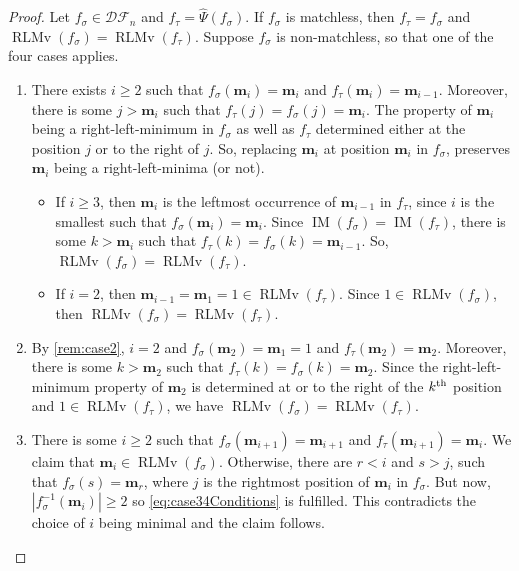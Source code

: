 \documentclass[reqno]{amsart}
\theoremstyle{definition}
\newcommand{\thsup}{\textnormal{th}}
\newcommand{\DSEF}{\mathcal{DF}}%
\newcommand{\fretherD}{\hat{\Psi}}
\newcommand{\caseOne}{\ensuremath{\heartsuit}}
\newcommand{\caseTwo}{\ensuremath{\spadesuit}}
\newcommand{\caseThree}{\ensuremath{\diamondsuit}}
\newcommand{\img}{\mathbf{m}}
\DeclareMathOperator{\RLMv}{RLMv}
\DeclareMathOperator{\supp}{IM}
\begin{document}
\begin{proof}
Let $f_\sigma\in \DSEF_n$ and $f_\tau=\fretherD(f_\sigma)$. 
If $f_\sigma$ is matchless, then $f_\tau=f_\sigma$ and  $\RLMv(f_\sigma)=\RLMv(f_\tau)$.
Suppose $f_\sigma$ is non-matchless, so that one of the four cases applies.

\begin{enumerate}[leftmargin=2cm]
 
	\item[\textbf{Case \caseOne:}] 
	There exists $i\geq 2$ such that $f_\sigma(\img_i)=\img_i$ and 
	$f_\tau(\img_i)=\img_{i-1}$. 
	Moreover, there is some $j>\img_i$ such that $f_\tau(j)=f_\sigma(j)=\img_i$. 
	The property of $\img_i$ being a right-left-minimum in $f_\sigma$
	as well as $f_\tau$ determined either at the position $j$
	or to the right of $j$. So, replacing $\img_i$ at position
	$\img_i$ in $f_\sigma$, preserves $\img_i$
	being a right-left-minima (or not).
	
	\begin{itemize}
		\item If $i\geq 3$, then $\img_i$ is the leftmost occurrence of $\img_{i-1}$ in $f_\tau$,
		since $i$ is the smallest such that $f_\sigma(\img_{i})=\img_i$.
		Since $\supp(f_\sigma)=\supp(f_\tau)$, there is some $k>\img_i$
		such that $f_\tau(k)=f_\sigma(k)=\img_{i-1}$.
		So, $\RLMv(f_\sigma)=\RLMv(f_\tau)$.
		
		\item If $i=2$, then $\img_{i-1}=\img_1=1\in\RLMv(f_\tau)$. Since $1\in \RLMv(f_\sigma)$, then $\RLMv(f_\sigma)=\RLMv(f_\tau)$.
	\end{itemize}
	
	\item[\textbf{Case \caseTwo:}]
	By \cref{rem:case2}, $i=2$ and $f_\sigma(\img_2)=\img_1=1$
	and $f_\tau(\img_2)=\img_2$. 
	Moreover, there is some $k>\img_2$
	such that $f_\tau(k)=f_\sigma(k)=\img_2$.
	Since the right-left-minimum property of $\img_2$
	is determined at or to the right of the $k^\thsup$
	position and $1\in \RLMv(f_\tau)$, we have $\RLMv(f_\sigma)=\RLMv(f_\tau)$.
	
	
	\item[\textbf{Case \caseThree:}]
	There is some $i\geq 2$ such that $f_\sigma(\img_{i+1})=\img_{i+1}$
	and $f_\tau(\img_{i+1})=\img_{i}$.
	We claim that $\img_i\in\RLMv(f_\sigma)$.
	Otherwise, there are $r<i$ and $s>j$,
	such that $f_\sigma(s)=\img_r$, where $j$ is the rightmost position of $\img_i$ in $f_\sigma$.
	But now, $|f_\sigma^{-1}(\img_i)| \geq 2$
	so \eqref{eq:case34Conditions} is fulfilled.
	This contradicts the choice of $i$ being minimal and the claim follows.
	

\end{enumerate}
\end{proof}
\end{document}
